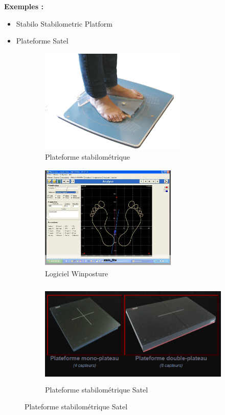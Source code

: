 \textbf{Exemples :}
\begin{itemize}
  \item Stabilo Stabilometric Platform
  \item Plateforme Satel
\end{itemize}

\begin{figure}[ht]
  \centering
  \begin{subfigure}[b]{0.45\textwidth}
    \centering
    \includegraphics[height=5cm]{images/pression_plantaire/plateforme-stabilometrique.png}
    \caption{Plateforme stabilométrique}\label{fig:plateforme_stabilometrique}
  \end{subfigure}
  \begin{subfigure}[b]{0.45\textwidth}
    \centering
    \includegraphics[height=5cm]{images/pression_plantaire/winposture.png}
    \caption{Logiciel Winposture}\label{fig:winposture}
  \end{subfigure}
  \begin{subfigure}[b]{0.45\textwidth}
    \centering
    \includegraphics[height=5cm]{images/pression_plantaire/satel.png}
    \caption{Plateforme stabilométrique Satel}\label{fig:satel}
  \end{subfigure}
\end{figure}

